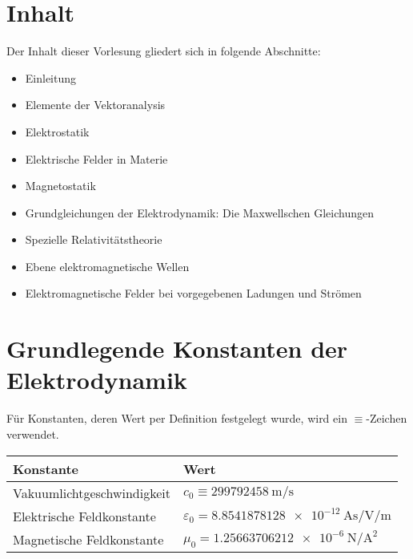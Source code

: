 \section{Inhalt}

Der Inhalt dieser Vorlesung gliedert sich in folgende Abschnitte:

\begin{itemize}
	\item Einleitung

	\item Elemente der Vektoranalysis

	\item Elektrostatik

	\item Elektrische Felder in Materie

	\item Magnetostatik

	\item Grundgleichungen der Elektrodynamik: Die Maxwellschen Gleichungen

	\item Spezielle Relativitätstheorie

	\item Ebene elektromagnetische Wellen

	\item Elektromagnetische Felder bei vorgegebenen Ladungen und Strömen
\end{itemize}



\section{Grundlegende Konstanten der Elektrodynamik}

Für Konstanten, deren Wert per Definition festgelegt wurde, wird ein $\equiv $-Zeichen verwendet.


\begin{table}[H]
	\centering
	\begin{tabular}{|l|l|} \hline
		\textbf{Konstante}         & \textbf{Wert}                                                     \\\hline
		Vakuumlichtgeschwindigkeit & \centering\arraybackslash{}$c_{0}\equiv \SI{299792458}{\m\per\s}$ \\
		Elektrische Feldkonstante  & $\varepsilon _{0}=\SI{8,8541878128e-12}{\A\s\per\V\per\m}$        \\
		Magnetische Feldkonstante  & $\mu _{0}=\SI{1,25663706212e-6}{\N\per\square\A}$                 \\
		\hline
	\end{tabular}
\end{table}




